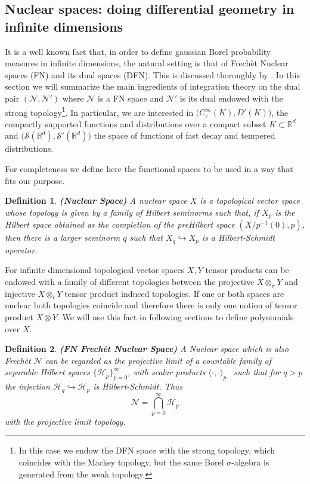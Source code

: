 \documentclass[12pt]{article}%
\newtheorem{definition}{Definition}%
\begin{document}
\subsection{Nuclear spaces: doing differential geometry in infinite dimensions}
It is a well known fact that, in order to define gaussian Borel probability measures in infinite dimensions, the natural setting is that of Frechèt Nuclear spaces (FN) and its dual spaces (DFN). This is discussed thoroughly by \cite{Gellfand}. In this section we will summarize the main ingredients of integration theory on the dual pair  $(\mathcal{N},\mathcal{N}')$ where $\mathcal{N}$ is a FN space and $\mathcal{N}'$ is its dual endowed with the strong topology\footnote{In this case we endow the DFN space with the strong topology, which coincides with the Mackey topology, but the same Borel $\sigma$-algebra is generated from the weak topology. }. In particular, we are interested in
$\big(C^{\infty}_c(K),D'(K)\big)$, the compactly supported functions and distributions over a compact subset $K\subset \mathbb{R}^{d}$ and $\big(\mathcal{S}(\mathbb{R}^d),\mathcal{S}'(\mathbb{R}^d)\big)$ the space of functions of fast decay and tempered distributions. 
 
For completeness we define here the functional spaces to be used in a way that fits our purpose.

\begin{definition}
    \label{def:Nuclear}
    {\bf (Nuclear Space)} A nuclear space $X$ is a  topological vector space whose topology is given by a family of Hilbert seminorms  such that, if $X_{p}$ is the Hilbert space obtained as  the completion of the preHilbert  space $(X/p^{-1}(0), p)$, then there is a larger seminorm $q$ such that $X_q\hookrightarrow X_p$ is a Hilbert-Schmidt operator. 
\end{definition}

For infinite dimensional topological vector spaces $X,Y$ tensor products  can be endowed with a family of  different topologies between the projective $X\otimes_\pi Y$ and injective $X\otimes_\epsilon Y$ tensor product induced topologies.  If one or both spaces are nuclear both topologies coincide and therefore there is only one notion of tensor product $X\otimes Y$. We will  use this fact in following sections to define polynomials over $X$.

\begin{definition}
    \label{def:FN}
    {\bf (FN Frechèt Nuclear Space)} A Nuclear space which is also Frechèt  $\mathcal{N}$  can be regarded as the projective limit of a countable family of separable Hilbert spaces $\{\mathcal{H}_p\}_{p=0}^\infty$, with scalar products $\langle \cdot, \cdot  \rangle_p$ \ such that for $q>p$     
    the injection $\mathcal{H}_q\hookrightarrow \mathcal{H}_p$ is Hilbert-Schmidt. Thus
    $$
    \mathcal{N}=\bigcap_{p=0}^\infty\mathcal{H}_p 
    $$
    with the projective limit topology. 
\end{definition}
\end{document}
